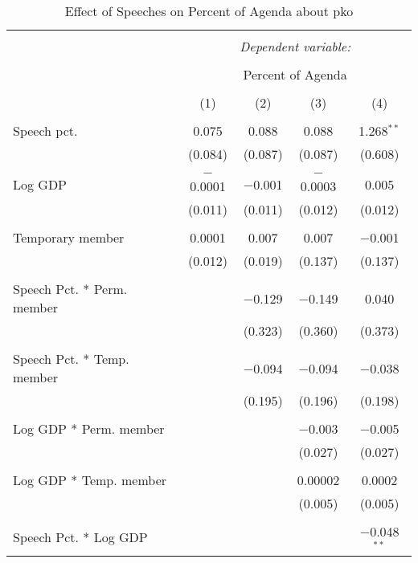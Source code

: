 
\begin{table}[!htbp] \centering 
  \caption{Effect of Speeches on Percent of Agenda about  pko} 
  \label{} 
\begin{tabular}{@{\extracolsep{5pt}}lcccc} 
\\[-1.8ex]\hline 
\hline \\[-1.8ex] 
 & \multicolumn{4}{c}{\textit{Dependent variable:}} \\ 
\cline{2-5} 
\\[-1.8ex] & \multicolumn{4}{c}{Percent of Agenda} \\ 
\\[-1.8ex] & (1) & (2) & (3) & (4)\\ 
\hline \\[-1.8ex] 
 Speech pct. & 0.075 & 0.088 & 0.088 & 1.268$^{**}$ \\ 
  & (0.084) & (0.087) & (0.087) & (0.608) \\ 
  & & & & \\ 
 Log GDP & $-$0.0001 & $-$0.001 & $-$0.0003 & 0.005 \\ 
  & (0.011) & (0.011) & (0.012) & (0.012) \\ 
  & & & & \\ 
 Temporary member & 0.0001 & 0.007 & 0.007 & $-$0.001 \\ 
  & (0.012) & (0.019) & (0.137) & (0.137) \\ 
  & & & & \\ 
 Speech Pct. * Perm. member &  & $-$0.129 & $-$0.149 & 0.040 \\ 
  &  & (0.323) & (0.360) & (0.373) \\ 
  & & & & \\ 
 Speech Pct. * Temp. member &  & $-$0.094 & $-$0.094 & $-$0.038 \\ 
  &  & (0.195) & (0.196) & (0.198) \\ 
  & & & & \\ 
 Log GDP * Perm. member &  &  & $-$0.003 & $-$0.005 \\ 
  &  &  & (0.027) & (0.027) \\ 
  & & & & \\ 
 Log GDP * Temp. member &  &  & 0.00002 & 0.0002 \\ 
  &  &  & (0.005) & (0.005) \\ 
  & & & & \\ 
 Speech Pct. * Log GDP &  &  &  & $-$0.048$^{**}$ \\ 

\end{tabular}
\end{table}
